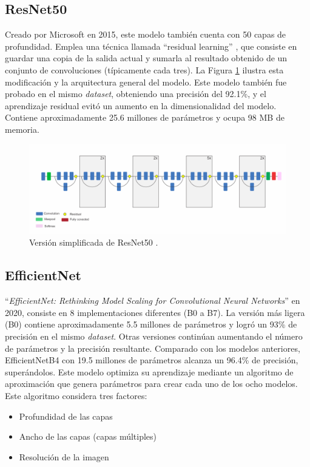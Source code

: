 \subsection{ResNet50} 
Creado por Microsoft en 2015, este modelo también cuenta con 50 capas de
profundidad. Emplea una técnica llamada “residual learning”
\cite{He2015}, que consiste en guardar una copia de la salida actual y
sumarla al resultado obtenido de un conjunto de convoluciones (típicamente
cada tres). La Figura \ref{ResNet} ilustra esta modificación y la arquitectura
general del modelo. Este modelo también fue probado en el mismo
\textit{dataset}, obteniendo una precisión del 92.1\%, y el aprendizaje
residual evitó un aumento en la dimensionalidad del modelo.
Contiene aproximadamente 25.6 millones de parámetros y ocupa 98 MB de memoria.

\begin{figure}[h!] 
    \includegraphics[width=1\textwidth]{images/ResNet.png} 
    \centering 
    \caption{Versión simplificada de ResNet50 \protect\cite{modelos}.} 
    \label{ResNet} 
\end{figure}

\subsection{EfficientNet} 
``\textit{EfficientNet: Rethinking Model Scaling for 
Convolutional Neural Networks}''\cite{Tan2020} en 2020, 
consiste en 8 implementaciones diferentes (B0 a B7).
La versión más ligera (B0) contiene aproximadamente 5.5 
millones de parámetros y logró un 93\% de precisión en el 
mismo \textit{dataset}. Otras versiones continúan aumentando 
el número de parámetros y la precisión resultante. Comparado 
con los modelos anteriores, EfficientNetB4 con 19.5 millones 
de parámetros alcanza un 96.4\% de precisión, superándolos.
Este modelo optimiza su aprendizaje mediante un algoritmo de 
aproximación que genera parámetros para crear cada uno de 
los ocho modelos. Este algoritmo considera tres factores:

\begin{itemize} 
    \item Profundidad de las capas 
    \item Ancho de las capas (capas múltiples) 
    \item Resolución de la imagen 
\end{itemize} 

